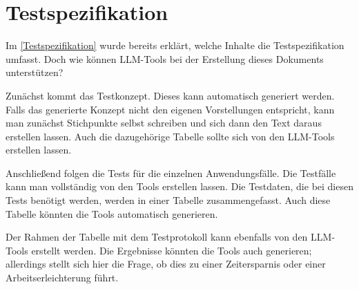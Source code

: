 \section{Testspezifikation}  \label{LLMTestspezifikation}

Im \autoref{Testspezifikation} wurde bereits erklärt, welche Inhalte die Testspezifikation umfasst. Doch wie können 
LLM-Tools bei der Erstellung dieses Dokuments unterstützen?

Zunächst kommt das Testkonzept. Dieses kann automatisch generiert werden. Falls das generierte Konzept nicht den 
eigenen Vorstellungen entspricht, kann man zunächst Stichpunkte selbst schreiben und sich dann den Text daraus 
erstellen lassen. Auch die dazugehörige Tabelle sollte sich von den LLM-Tools erstellen lassen.

Anschließend folgen die Tests für die einzelnen Anwendungsfälle. Die Testfälle kann man vollständig von den Tools 
erstellen lassen. Die Testdaten, die bei diesen Tests benötigt werden, werden in einer Tabelle zusammengefasst. 
Auch diese Tabelle könnten die Tools automatisch generieren.

Der Rahmen der Tabelle mit dem Testprotokoll kann ebenfalls von den LLM-Tools erstellt werden. Die Ergebnisse 
könnten die Tools auch generieren; allerdings stellt sich hier die Frage, ob dies zu einer Zeitersparnis oder 
einer Arbeitserleichterung führt.
